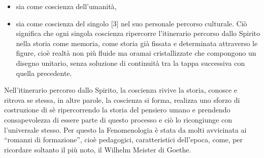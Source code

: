 \documentclass[a4paper,12pt,oneside,openany]{book}%
\begin{document}
\begin{itemize}
	\item sia come coscienza dell’umanità,
	\item sia come coscienza del singolo [3] nel suo personale percorso culturale. Ciò significa che ogni singola coscienza ripercorre l’itinerario percorso dallo Spirito nella storia come memoria, come storia già fissata e determinata attraverso le figure, cioè realtà non più fluide ma oramai cristallizzate che compongono un disegno unitario, senza soluzione di continuità tra la tappa successiva con quella precedente.
\end{itemize}	
	
Nell’itinerario percorso dallo Spirito, la coscienza rivive la storia, conosce e ritrova se stessa, in altre parole, la coscienza si forma, realizza uno sforzo di costruzione di sè ripercorrendo la storia del pensiero umano e prendendo consapevolezza di essere parte di questo processo e ciò lo ricongiunge con l’universale stesso. Per questo la Fenomenologia è stata da molti avvicinata ai “romanzi di formazione”, cioè pedagogici, caratteristici dell’epoca, come, per ricordare soltanto il più noto, il Wilhelm Meister di Goethe.
\end{document}
